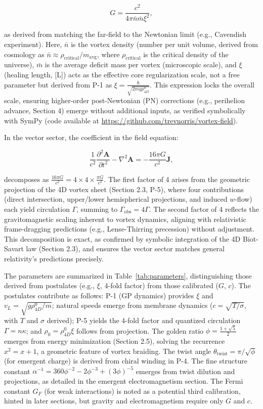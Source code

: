 \[
G = \frac{c^2}{4\pi \bar{n} \bar{m} \xi^2},
\]

as derived from matching the far-field to the Newtonian limit (e.g., Cavendish experiment). Here, $\bar{n}$ is the vortex density (number per unit volume, derived from cosmology as $\bar{n} \approx \rho_{\text{critical}} / m_{\text{avg}}$, where $\rho_{\text{critical}}$ is the critical density of the universe), $\bar{m}$ is the average deficit mass per vortex (microscopic scale), and $\xi$ (healing length, [L]) acts as the effective core regularization scale, not a free parameter but derived from P-1 as $\xi = \frac{\hbar}{\sqrt{2 m g \rho_{4D}^0}}$. This expression locks the overall scale, ensuring higher-order post-Newtonian (PN) corrections (e.g., perihelion advance, Section 4) emerge without additional inputs, as verified symbolically with SymPy (code available at \url{https://github.com/trevnorris/vortex-field}).

In the vector sector, the coefficient in the field equation:

\[
\frac{1}{c^2} \frac{\partial^2 \mathbf{A}}{\partial t^2} - \nabla^2 \mathbf{A} = -\frac{16\pi G}{c^2} \mathbf{J},
\]

decomposes as $\frac{16\pi G}{c^2} = 4 \times 4 \times \frac{\pi G}{c^2}$. The first factor of 4 arises from the geometric projection of the 4D vortex sheet (Section 2.3, P-5), where four contributions (direct intersection, upper/lower hemispherical projections, and induced $w$-flow) each yield circulation $\Gamma$, summing to $\Gamma_{\text{obs}} = 4\Gamma$. The second factor of 4 reflects the gravitomagnetic scaling inherent to vortex dynamics, aligning with relativistic frame-dragging predictions (e.g., Lense-Thirring precession) without adjustment. This decomposition is exact, as confirmed by symbolic integration of the 4D Biot-Savart law (Section 2.3), and ensures the vector sector matches general relativity's predictions precisely.

The parameters are summarized in Table~\ref{tab:parameters}, distinguishing those derived from postulates (e.g., $\xi$, 4-fold factor) from those calibrated ($G$, $c$). The postulates contribute as follows: P-1 (GP dynamics) provides $\xi$ and $v_L = \sqrt{g \rho_{4D}^0 / m}$; natural speeds emerge from membrane dynamics ($c = \sqrt{T / \sigma}$, with $T$ and $\sigma$ derived); P-5 yields the 4-fold factor and quantized circulation $\Gamma = n \kappa$; and $\rho_0 = \rho_{4D}^0 \xi$ follows from projection. The golden ratio $\phi = \frac{1 + \sqrt{5}}{2}$ emerges from energy minimization (Section 2.5), solving the recurrence $x^2 = x + 1$, a geometric feature of vortex braiding. The twist angle $\theta_{\text{twist}} = \pi / \sqrt{\phi}$ (for emergent charge) is derived from chiral winding in P-4. The fine structure constant $\alpha^{-1} = 360 \phi^{-2} - 2 \phi^{-3} + (3 \phi)^{-5}$ emerges from twist dilution and projections, as detailed in the emergent electromagnetism section. The Fermi constant $G_F$ (for weak interactions) is noted as a potential third calibration, hinted in later sections, but gravity and electromagnetism require only $G$ and $c$.

